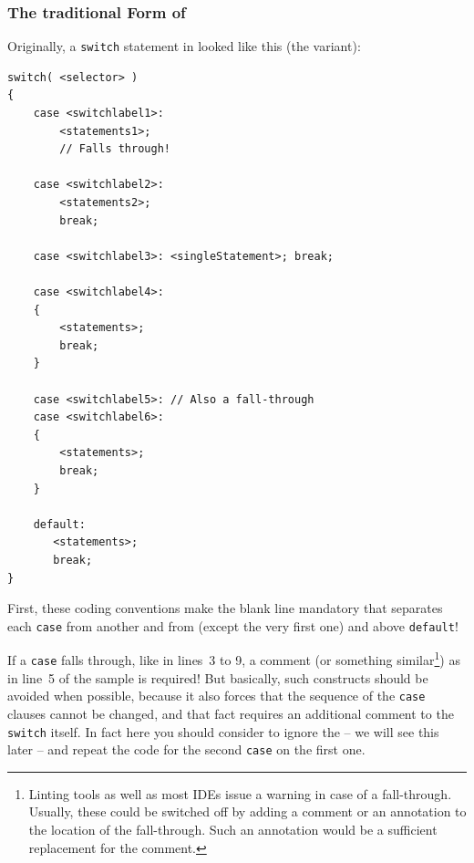 \subsubsection{The traditional Form of }\label{sec:TraditionalSwitch}
Originally, a \lstinline|switch| statement in \Java looked like this (the  variant):
\begin{lstlisting}
switch( <selector> )
{
    case <switchlabel1>:
        <statements1>;
        // Falls through!

    case <switchlabel2>:
        <statements2>;
        break;

    case <switchlabel3>: <singleStatement>; break;

    case <switchlabel4>:
    {
        <statements>;
        break;
    }

    case <switchlabel5>: // Also a fall-through
    case <switchlabel6>:
    {
        <statements>;
        break;
    }

    default:
       <statements>;
       break;
}
\end{lstlisting}

First, these coding conventions make the blank line mandatory that separates each \lstinline|case| from another and from (except the very first one) and above \lstinline|default|!
  
If a \lstinline|case| falls through, like in lines~3 to 9, a comment  (or something similar\footnote{Linting tools as well as most IDEs issue a warning in case of a fall-through. Usually, these could be switched off by adding a comment or an annotation to the location of the fall-through. Such an annotation would be a sufficient replacement for the comment.}) as in line~5 of the sample is required! But basically, such constructs should be avoided when possible, because it also forces that the sequence of the \lstinline|case| clauses cannot be changed, and that fact requires an additional comment to the \lstinline|switch| itself. In fact here you should consider to ignore the  – we will see this later – and repeat the code for the second \lstinline|case| on the first one.

